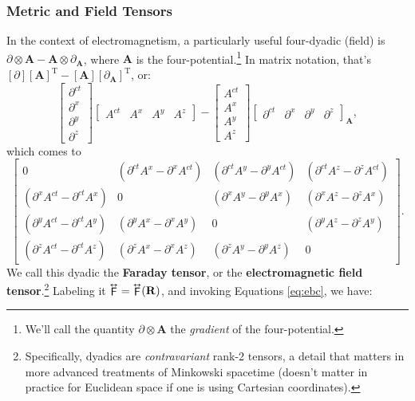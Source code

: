 \documentclass[12pt]{article}
\renewcommand{\vv}[1]{\mathbf{#1}}
\newcommand{\tightoverset}[2]{%
  \mathop{#2}\limits^{\vbox to -.5ex{\kern-0.75ex\hbox{$#1$}\vss}}}
\newcommand{\inlinedy}[1]{\tightoverset{\text{\tiny$\bm\leftrightarrow$}}{#1}}
\begin{document}
\subsubsection{Metric and Field Tensors}\label{sssec:mfd}

In the context of electromagnetism, a particularly useful four-dyadic (field) is $\partialup \otimes \vv A - \vv A \otimes \partialup_{\vv A}$, where $\vv A$ is the four-potential.\footnote{We'll call the quantity $\partialup \otimes \vv A$ the \emph{gradient} of the four-potential.} In matrix notation, that's $[\partialup][\vv A]^{\mathrm{T}} - [\vv A][\partialup_{\vv A}]^{\mathrm{T}}$, or:
\begin{equation*}
\begin{bmatrix}
\partial^{ct} \\
\partial^x \\
\partial^y \\
\partial^z
\end{bmatrix}
\begin{bmatrix}
A^{ct} & A^x & A^y & A^z
\end{bmatrix}
-
\begin{bmatrix}
A^{ct} \\
A^x \\
A^y \\
A^z
\end{bmatrix}
\begin{bmatrix}
\partial^{ct} & \partial^x & \partial^y & \partial^z
\end{bmatrix}_{\vv A},
\end{equation*}
which comes to
\begin{equation*}
\begin{bmatrix}
0 & ( \partial^{ct} A^x - \partial^x A^{ct} ) & ( \partial^{ct} A^y - \partial^y A^{ct} ) & ( \partial^{ct} A^z - \partial^z A^{ct} ) \\[1.5ex]
( \partial^x A^{ct} - \partial^{ct} A^x ) & 0 & ( \partial^x A^y - \partial^y A^x ) & ( \partial^x A^z - \partial^z A^x ) \\[1.5ex]
( \partial^y A^{ct} - \partial^{ct} A^y ) & ( \partial^y A^x - \partial^x A^y ) & 0 & ( \partial^y A^z - \partial^z A^y ) \\[1.5ex]
( \partial^z A^{ct} - \partial^{ct} A^z ) & ( \partial^z A^x - \partial^x A^z ) & ( \partial^z A^y - \partial^y A^z ) & 0
\end{bmatrix} .
\end{equation*}
We call this dyadic the \textbf{Faraday tensor}, or the \textbf{electromagnetic field tensor}.\footnote{\label{fn:dy}Specifically, dyadics are \emph{contravariant} rank-2 tensors, a detail that matters in more advanced treatments of Minkowski spacetime (doesn't matter in practice for Euclidean space if one is using Cartesian coordinates).} Labeling it $\inlinedy{\mathsf{F}} = \inlinedy{\mathsf{F}} (\vv R)$, and invoking Equations \ref{eq:ebc}, we have:
\end{document}
